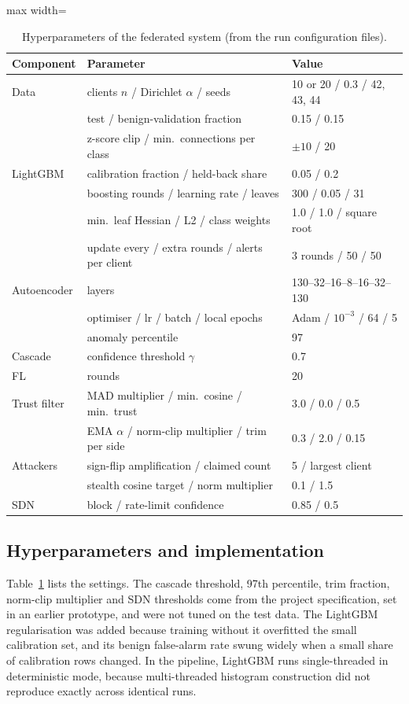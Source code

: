 \begin{table}[t]
\centering
\caption{Hyperparameters of the federated system (from the run configuration files).}
\label{tab:hyper}
\small
\begin{adjustbox}{max width=\linewidth}
\begin{tabular}{lll}
\toprule
Component & Parameter & Value \\
\midrule
Data & clients $n$ / Dirichlet $\alpha$ / seeds & 10 or 20 / 0.3 / 42, 43, 44 \\
 & test / benign-validation fraction & 0.15 / 0.15 \\
 & z-score clip / min.\ connections per class & $\pm10$ / 20 \\
LightGBM & calibration fraction / held-back share & 0.05 / 0.2 \\
 & boosting rounds / learning rate / leaves & 300 / 0.05 / 31 \\
 & min.\ leaf Hessian / L2 / class weights & 1.0 / 1.0 / square root \\
 & update every / extra rounds / alerts per client & 3 rounds / 50 / 50 \\
Autoencoder & layers & 130--32--16--8--16--32--130 \\
 & optimiser / lr / batch / local epochs & Adam / $10^{-3}$ / 64 / 5 \\
 & anomaly percentile & 97 \\
Cascade & confidence threshold $\gamma$ & 0.7 \\
FL & rounds & 20 \\
Trust filter & MAD multiplier / min.\ cosine / min.\ trust & 3.0 / 0.0 / 0.5 \\
 & EMA $\alpha$ / norm-clip multiplier / trim per side & 0.3 / 2.0 / 0.15 \\
Attackers & sign-flip amplification / claimed count & 5 / largest client \\
 & stealth cosine target / norm multiplier & 0.1 / 1.5 \\
SDN & block / rate-limit confidence & 0.85 / 0.5 \\
\bottomrule
\end{tabular}
\end{adjustbox}
\end{table}

\subsection{Hyperparameters and implementation}
Table~\ref{tab:hyper} lists the settings. The cascade threshold, 97th percentile, trim fraction, norm-clip multiplier and SDN thresholds come from the project specification, set in an earlier prototype, and were not tuned on the test data. The LightGBM regularisation was added because training without it overfitted the small calibration set, and its benign false-alarm rate swung widely when a small share of calibration rows changed. In the pipeline, LightGBM runs single-threaded in deterministic mode, because multi-threaded histogram construction did not reproduce exactly across identical runs.

